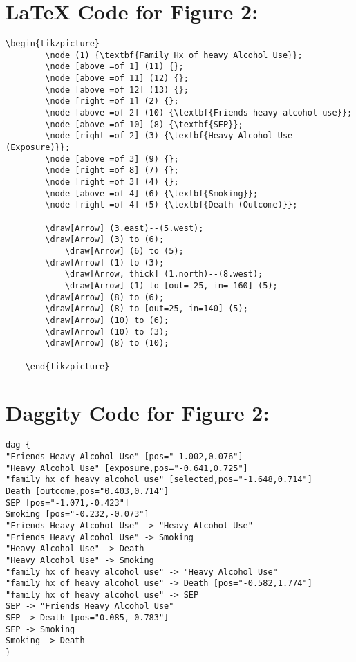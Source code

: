 \documentclass{article}
\begin{document}
\section*{\LaTeX\hspace*{1mm} Code for Figure 2:}
\begin{lstlisting}[frame=single, basicstyle=\ttfamily, linewidth=20.5cm]
    \begin{tikzpicture}
        \node (1) {\textbf{Family Hx of heavy Alcohol Use}};
        \node [above =of 1] (11) {};
        \node [above =of 11] (12) {};
        \node [above =of 12] (13) {};
        \node [right =of 1] (2) {};
        \node [above =of 2] (10) {\textbf{Friends heavy alcohol use}};
        \node [above =of 10] (8) {\textbf{SEP}};
        \node [right =of 2] (3) {\textbf{Heavy Alcohol Use (Exposure)}};
        \node [above =of 3] (9) {};
        \node [right =of 8] (7) {};
        \node [right =of 3] (4) {};
        \node [above =of 4] (6) {\textbf{Smoking}};
        \node [right =of 4] (5) {\textbf{Death (Outcome)}};
    
        \draw[Arrow] (3.east)--(5.west);
        \draw[Arrow] (3) to (6);
            \draw[Arrow] (6) to (5);
        \draw[Arrow] (1) to (3);
            \draw[Arrow, thick] (1.north)--(8.west);
            \draw[Arrow] (1) to [out=-25, in=-160] (5);
        \draw[Arrow] (8) to (6);
        \draw[Arrow] (8) to [out=25, in=140] (5);
        \draw[Arrow] (10) to (6);
        \draw[Arrow] (10) to (3);
        \draw[Arrow] (8) to (10);
    
    \end{tikzpicture}
    \end{lstlisting}

    \section*{Daggity Code for Figure 2:}
\begin{lstlisting}[frame=single, basicstyle=\ttfamily, linewidth=20.5cm]
    dag {
"Friends Heavy Alcohol Use" [pos="-1.002,0.076"]
"Heavy Alcohol Use" [exposure,pos="-0.641,0.725"]
"family hx of heavy alcohol use" [selected,pos="-1.648,0.714"]
Death [outcome,pos="0.403,0.714"]
SEP [pos="-1.071,-0.423"]
Smoking [pos="-0.232,-0.073"]
"Friends Heavy Alcohol Use" -> "Heavy Alcohol Use"
"Friends Heavy Alcohol Use" -> Smoking
"Heavy Alcohol Use" -> Death
"Heavy Alcohol Use" -> Smoking
"family hx of heavy alcohol use" -> "Heavy Alcohol Use"
"family hx of heavy alcohol use" -> Death [pos="-0.582,1.774"]
"family hx of heavy alcohol use" -> SEP
SEP -> "Friends Heavy Alcohol Use"
SEP -> Death [pos="0.085,-0.783"]
SEP -> Smoking
Smoking -> Death
}
\end{lstlisting}
    
\end{document}
